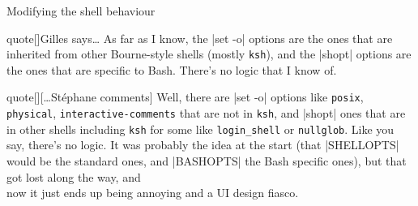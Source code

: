 \begin{frame}{Modifying the shell behaviour}
\begin{onlyenv}
\begin{varblock}{quote}[\textwidth]{Gilles says\ldots}
            \footnotesize
            As far as I know, the \textnormal{\bash|set -o|} options are the ones that are inherited from other Bourne-style shells (mostly \textnormal{\texttt{ksh}}), and the \textnormal{\bash|shopt|} options are the ones that are specific to Bash.
            \alert{There's no logic that I know of.}
        \end{varblock}
        \vspace{-2mm}
        \begin{varblock}{quote}[\textwidth]{}[\ldots{}St\'ephane comments]
            \footnotesize
            Well, there are \textnormal{\bash|set -o|}  options like \textnormal{\texttt{posix}}, \textnormal{\texttt{physical}}, \textnormal{\texttt{interactive-comments}} that are not in \textnormal{\texttt{ksh}}, and \textnormal{\bash|shopt|} ones that are in other shells including \textnormal{\texttt{ksh}} for some like \textnormal{\texttt{login\_shell}} or \textnormal{\texttt{nullglob}}.
            Like you say, there's no logic.
            It was probably the idea at the start (that \textnormal{\bash|SHELLOPTS|} would be the standard ones, and \textnormal{\bash|BASHOPTS|} the Bash specific ones), but that got lost along the way, and\\
            \alert{now it just ends up being annoying and a UI design fiasco.}\\[-0.7em] ~
        \end{varblock}
    \end{onlyenv}
\end{frame}
